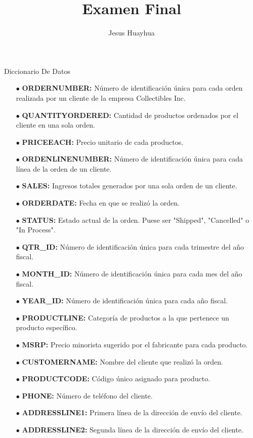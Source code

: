 \documentclass[a4paper]{article}
\title{Examen Final}
\author{Jesus Huayhua}
\begin{document}
  
  \newpage
  \begin{center}
    \LARGE Diccionario De Datos
  \end{center}
  \begin{itemize}
    \item [$\bullet$] \textbf{ORDERNUMBER:} Número de identificación única para cada orden realizada por un cliente de la empresa Collectibles Inc.
    \item [$\bullet$] \textbf{QUANTITYORDERED:} Cantidad de productos ordenados por el cliente en una sola orden.
    \item [$\bullet$] \textbf{PRICEEACH:} Precio unitario de cada productos.
    \item [$\bullet$] \textbf{ORDENLINENUMBER:} Número de identificación única para cada línea de la orden de un cliente.
    \item [$\bullet$] \textbf{SALES:} Ingresos totales generados por una sola orden de un cliente.
    \item [$\bullet$] \textbf{ORDERDATE:} Fecha en que se realizó la orden.
    \item [$\bullet$] \textbf{STATUS:}  Estado actual de la orden. Puese ser "Shipped", "Cancelled" o "In Process".
    \item [$\bullet$] \textbf{QTR\_ID:} Número de identificación única para cada trimestre del año fiscal.
    \item [$\bullet$] \textbf{MONTH\_ID:} Número de identificación única para cada mes del año fiscal.
    \item [$\bullet$] \textbf{YEAR\_ID:} Número de identificación única para cada año fiscal.
    \item [$\bullet$] \textbf{PRODUCTLINE:} Categoría de productos a la que pertenece un producto específico.
    \item [$\bullet$] \textbf{MSRP:} Precio minorista sugerido por el fabricante para cada producto.
    \item [$\bullet$] \textbf{CUSTOMERNAME:} Nombre del cliente que realizó la orden.
    \item [$\bullet$] \textbf{PRODUCTCODE:} Código único asignado para producto.
    \item [$\bullet$] \textbf{PHONE:} Número de teléfono del cliente.
    \item [$\bullet$] \textbf{ADDRESSLINE1:} Primera línea de la dirección de envío del cliente.
    \item [$\bullet$] \textbf{ADDRESSLINE2:} Segunda línea de la dirección de envío del cliente.

\end{itemize}
\end{document}
